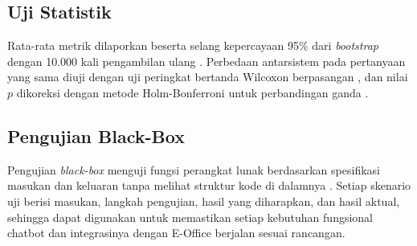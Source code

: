 \subsection{Uji Statistik}
Rata-rata metrik dilaporkan beserta selang kepercayaan 95\% dari \textit{bootstrap} dengan 10.000 kali pengambilan ulang \parencite{efron1993bootstrap}. Perbedaan antarsistem pada pertanyaan yang sama diuji dengan uji peringkat bertanda Wilcoxon berpasangan \parencite{wilcoxon1945}, dan nilai $p$ dikoreksi dengan metode Holm-Bonferroni untuk perbandingan ganda \parencite{holm1979}.

\subsection{Pengujian Black-Box}
Pengujian \textit{black-box} menguji fungsi perangkat lunak berdasarkan spesifikasi masukan dan keluaran tanpa melihat struktur kode di dalamnya \parencite{myers2011art}. Setiap skenario uji berisi masukan, langkah pengujian, hasil yang diharapkan, dan hasil aktual, sehingga dapat digunakan untuk memastikan setiap kebutuhan fungsional chatbot dan integrasinya dengan E-Office berjalan sesuai rancangan.
